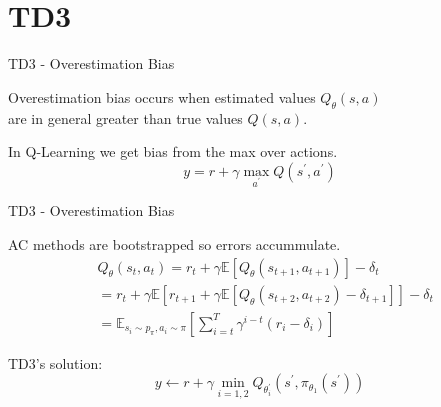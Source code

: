 \documentclass{beamer}
\begin{document}

\section{TD3}
\begin{frame}{TD3 - Overestimation Bias}
    \begin{itemize}
 {
        \vspace{0.5cm}
        \item Overestimation bias occurs when estimated values $Q_{θ}(s, a)$ \\
        are in general greater than true values $Q(s, a)$.
        }
 {
        \vspace{0.5cm}
        \item In Q-Learning we get bias from the max over actions.
        $$y=r+\gamma \max _{a^{\prime}} Q\left(s^{\prime}, a^{\prime}\right)$$
        }
        \end{itemize}
\end{frame}


\begin{frame}{TD3 - Overestimation Bias}
    \begin{itemize}
 {
        \vspace{0.5cm}
        \item AC methods are bootstrapped so errors accummulate.
        \begin{equation*}
        \begin{split}
            &Q_{\theta}\left(s_{t}, a_{t}\right)=r_{t}+\gamma \mathbb{E}\left[Q_{\theta}\left(s_{t+1}, a_{t+1}\right)\right]-\delta_{t} \\
            &=r_{t}+\gamma \mathbb{E}\left[r_{t+1}+\gamma \mathbb{E}\left[Q_{\theta}\left(s_{t+2}, a_{t+2}\right)-\delta_{t+1}\right]\right]-\delta_{t} \\
            &=\mathbb{E}_{s_{i} \sim p_{\pi}, a_{i} \sim \pi}\left[\sum_{i=t}^{T} \gamma^{i-t}\left(r_{i}-\delta_{i}\right)\right]
        \end{split}
        \end{equation*}
        }
 {
        \item TD3's solution:
        $$y \leftarrow r+\gamma \min _{i=1,2} Q_{\theta_{i}^{\prime}}\left(s^{\prime}, 
        \pi_{\theta_1}(s^{\prime})\right)$$
        }
        \end{itemize}
\end{frame}
\end{document}
